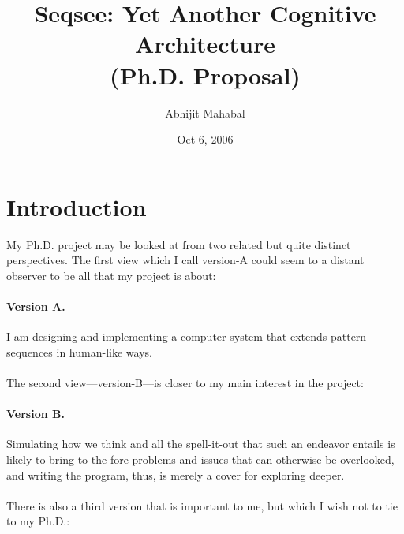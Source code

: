 \documentclass{article}
\begin{document}
\title{Seqsee: Yet Another Cognitive Architecture\\{(Ph.D. Proposal)}}
\author{Abhijit Mahabal}
\date{Oct 6, 2006}
\maketitle

\renewcommand{\baselinestretch}{1.5}\small

\section*{Introduction}
\label{sec:intro}

\newcommand{\V}[1]{version-#1\xspace}
\newcommand{\hof}{Hofstadter\xspace}
\newcommand{\dan}{Dan Dennett\xspace}
\newcommand{\andy}{Andy Clark\xspace}
\newcommand{\seq}{Seqsee\xspace}
\newcommand{\tofillout}[1]{[Need to fill gap: #1\index{Gaps!#1}]}


My Ph.D. project may be looked at from two related but quite distinct perspectives.  The first view which I call \V{A} could seem to a distant observer to be all that my project is about:

\paragraph{Version A.} I am designing and implementing a computer system that extends pattern sequences in human-like ways.

\paragraph{} The second view---\V{B}---is closer to my main interest in the project:

\paragraph{Version B.} Simulating how we think and all the spell-it-out that such an endeavor entails is likely to bring to the fore problems and issues that can otherwise be overlooked, and writing the program, thus, is merely a cover for  exploring deeper.

\paragraph{} There is also a third version that is important to me, but which I wish not to tie to my Ph.D.:
\end{document}

